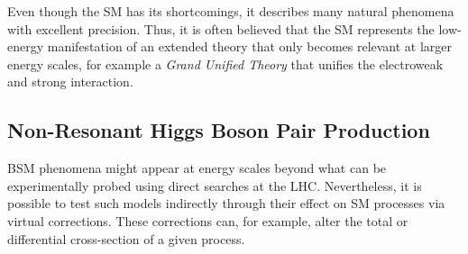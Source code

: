 \begin{description}





\end{description}
Even though the SM has its shortcomings, it describes many natural phenomena
with excellent precision. Thus, it is often believed that the SM represents the
low-energy manifestation of an extended theory that only becomes relevant at
larger energy scales, for example a \emph{Grand Unified Theory} that unifies the
electroweak and strong interaction.


\subsection{Non-Resonant Higgs Boson Pair Production}%
\label{sec:bsm_nonresonant_hh}

BSM phenomena might appear at energy scales beyond what can be experimentally
probed using direct searches at the LHC. Nevertheless, it is possible to test
such models indirectly through their effect on SM processes via virtual
corrections. These corrections can, for example, alter the total or differential
cross-section of a given process.

